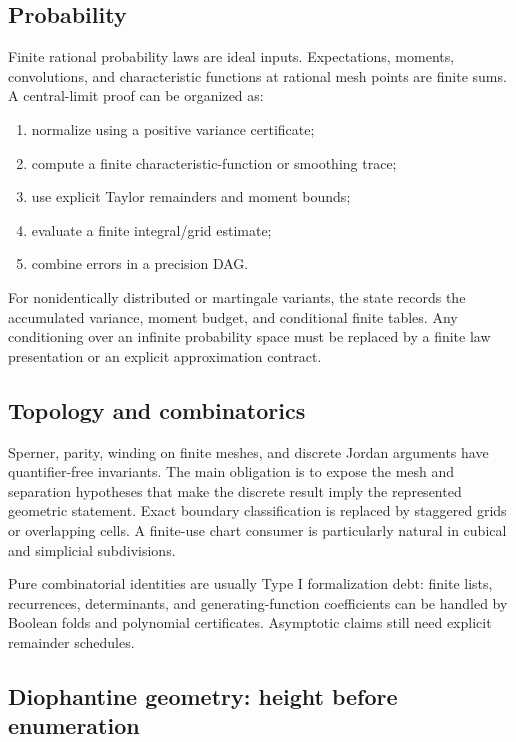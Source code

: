 \subsection{Probability}

Finite rational probability laws are ideal inputs.  Expectations, moments, convolutions, and characteristic functions at rational mesh points are finite sums.  A central-limit proof can be organized as:
\begin{enumerate}[label=\arabic*.]
\item normalize using a positive variance certificate;
\item compute a finite characteristic-function or smoothing trace;
\item use explicit Taylor remainders and moment bounds;
\item evaluate a finite integral/grid estimate;
\item combine errors in a precision DAG.
\end{enumerate}
For nonidentically distributed or martingale variants, the state records the accumulated variance, moment budget, and conditional finite tables.  Any conditioning over an infinite probability space must be replaced by a finite law presentation or an explicit approximation contract.

\subsection{Topology and combinatorics}

Sperner, parity, winding on finite meshes, and discrete Jordan arguments have quantifier-free invariants.  The main obligation is to expose the mesh and separation hypotheses that make the discrete result imply the represented geometric statement.  Exact boundary classification is replaced by staggered grids or overlapping cells.  A finite-use chart consumer is particularly natural in cubical and simplicial subdivisions.

Pure combinatorial identities are usually Type I formalization debt: finite lists, recurrences, determinants, and generating-function coefficients can be handled by Boolean folds and polynomial certificates.  Asymptotic claims still need explicit remainder schedules.

\subsection{Diophantine geometry: height before enumeration}

